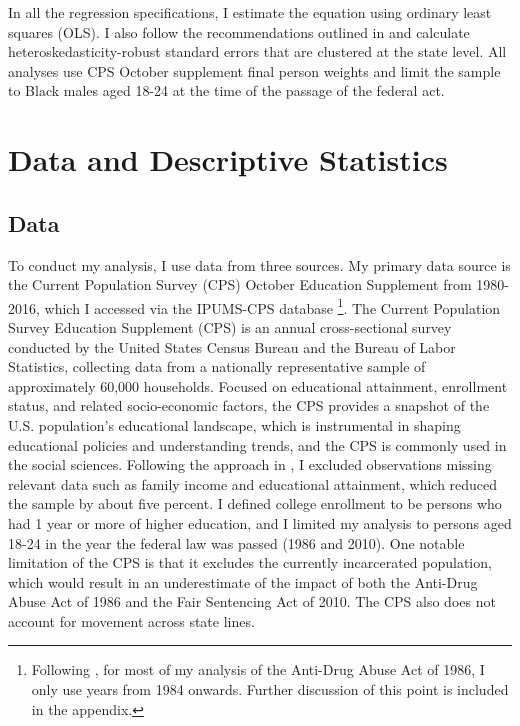 \documentclass{article}
\begin{document}
In all the regression specifications, I estimate the equation using ordinary least squares (OLS). I also follow the recommendations outlined in \cite{duflo_did} and calculate heteroskedasticity-robust standard errors that are clustered at the state level. All analyses use CPS October supplement final person weights and limit the sample to Black males aged 18-24 at the time of the passage of the federal act.

\section{Data and Descriptive Statistics}

\subsection{Data}
To conduct my analysis, I use data from three sources. My primary data source is the Current Population Survey (CPS) October Education Supplement from 1980-2016, which I accessed via the IPUMS-CPS database \citep{ipums_cps} \footnote{Following \cite{britton2022}, for most of my analysis of the Anti-Drug Abuse Act of 1986, I only use years from 1984 onwards. Further discussion of this point is included in the appendix.}. The Current Population Survey Education Supplement (CPS) is an annual cross-sectional survey conducted by the United States Census Bureau and the Bureau of Labor Statistics, collecting data from a nationally representative sample of approximately 60,000 households. Focused on educational attainment, enrollment status, and related socio-economic factors, the CPS provides a snapshot of the U.S. population's educational landscape, which is instrumental in shaping educational policies and understanding trends, and the CPS is commonly used in the social sciences. Following the approach in \cite{britton2022}, I excluded observations missing relevant data such as family income and educational attainment, which reduced the sample by about five percent. I defined college enrollment to be persons who had 1 year or more of higher education, and I limited my analysis to persons aged 18-24 in the year the federal law was passed (1986 and 2010). One notable limitation of the CPS is that it excludes the currently incarcerated population, which would result in an underestimate of the impact of both the Anti-Drug Abuse Act of 1986 and the Fair Sentencing Act of 2010. The CPS also does not account for movement across state lines.
\end{document}
